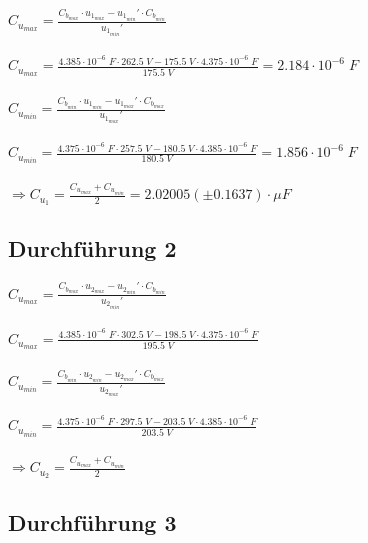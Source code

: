 \documentclass[a4paper,12pt]{article}
\begin{document}
$C_{u_{max}} = \displaystyle{\frac{C_{b_{max}}\cdot u_{1_{max}}-u_{1_{min}}'\cdot C_{b_{min}}}{u_{1_{min}}'}}$\\\\

$C_{u_{max}} = \displaystyle{\frac{4.385\cdot 10^{-6}\;F\cdot 262.5\;V-175.5\;V\cdot 4.375\cdot 10^{-6}\;F}{175.5\;V}} = 2.184\cdot 10^{-6}\;F$\\\\

$C_{u_{min}} = \displaystyle{\frac{C_{b_{min}}\cdot u_{1_{min}}-u_{1_{max}}'\cdot C_{b_{max}}}{u_{1_{max}}'}}$\\\\

$C_{u_{min}} = \displaystyle{\frac{4.375\cdot 10^{-6}\;F\cdot 257.5\;V-180.5\;V\cdot 4.385\cdot 10^{-6}\;F}{180.5\;V}} = 1.856\cdot 10^{-6}\;F$\\\\

$\Rightarrow C_{u_1}=\displaystyle{\frac{C_{u_{max}}+C_{u_{min}}}{2}} = 2.02005 (\pm 0.1637)\cdot \mu F$

\subsection{Durchführung 2}

$C_{u_{max}} = \displaystyle{\frac{C_{b_{max}}\cdot u_{2_{max}}-u_{2_{min}}'\cdot C_{b_{min}}}{u_{2_{min}}'}}$\\\\

$C_{u_{max}} = \displaystyle{\frac{4.385\cdot 10^{-6}\;F\cdot 302.5\;V-198.5\;V\cdot 4.375\cdot 10^{-6}\;F}{195.5\;V}}$\\\\

$C_{u_{min}} = \displaystyle{\frac{C_{b_{min}}\cdot u_{2_{min}}-u_{2_{max}}'\cdot C_{b_{max}}}{u_{2_{max}}'}}$\\\\

$C_{u_{min}} = \displaystyle{\frac{4.375\cdot 10^{-6}\;F\cdot 297.5\;V-203.5\;V\cdot 4.385\cdot 10^{-6}\;F}{203.5\;V}}$\\\\

$\Rightarrow C_{u_2}=\displaystyle{\frac{C_{u_{max}}+C_{u_{min}}}{2}}$

\subsection{Durchführung 3}
\end{document}
